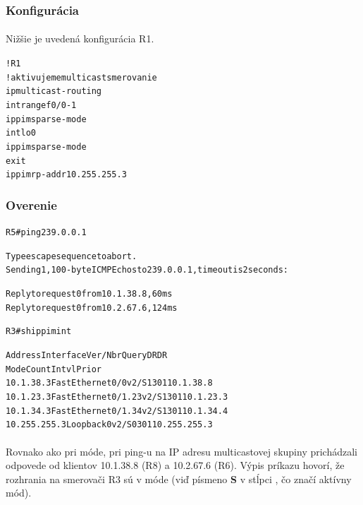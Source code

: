 \documentclass[12pt,twoside,a4paper]{report}
\begin{document}
\subsubsection{Konfigurácia}
\paragraph{}
Nižšie je uvedená konfigurácia R1.

\noindent
{\selectfont
\begin{small}
\begin{alltt}
!R1
!aktivujeme multicast smerovanie
ip multicast-routing
int range f0/0 - 1
  ip pim sparse-mode
int lo0
  ip pim sparse-mode
  exit
ip pim rp-addr 10.255.255.3
\end{alltt}
\end{small}
}


\subsubsection{Overenie}

\noindent
{\selectfont
\begin{small}
\begin{alltt}
R5#ping 239.0.0.1

Type escape sequence to abort.
Sending 1, 100-byte ICMP Echos to 239.0.0.1, timeout is 2 seconds:

Reply to request 0 from 10.1.38.8, 60 ms
Reply to request 0 from 10.2.67.6, 124 ms
\end{alltt}
\end{small}
}

\noindent
{\selectfont
\begin{small}
\begin{alltt}

R3#sh ip pim int

Address          Interface            Ver/   Nbr    Query  DR     DR
                                      Mode   Count  Intvl  Prior
10.1.38.3        FastEthernet0/0      v2/S   1      30     1      10.1.38.8
10.1.23.3        FastEthernet0/1.23   v2/S   1      30     1      10.1.23.3
10.1.34.3        FastEthernet0/1.34   v2/S   1      30     1      10.1.34.4
10.255.255.3     Loopback0            v2/S   0      30     1      10.255.255.3
\end{alltt}
\end{small}
}


\paragraph{}
Rovnako ako pri  móde, pri ping-u na IP adresu multicastovej skupiny prichádzali odpovede od klientov 10.1.38.8 (R8) a 10.2.67.6 (R6). Výpis príkazu  hovorí, že rozhrania na smerovači R3 sú v  móde (viď písmeno \textbf{S} v stĺpci , čo značí aktívny  mód).
\end{document}
